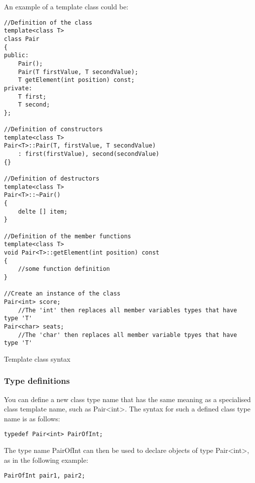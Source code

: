 An example of a template class could be:
\begin{listing}[H]
\begin{verbatim}
//Definition of the class
template<class T>
class Pair
{
public:
	Pair();
	Pair(T firstValue, T secondValue);
	T getElement(int position) const;
private:
	T first;
	T second;
};

//Definition of constructors
template<class T>
Pair<T>::Pair(T, firstValue, T secondValue)
	: first(firstValue), second(secondValue)
{}

//Definition of destructors
template<class T>
Pair<T>::~Pair()
{
	delte [] item;
}

//Definition of the member functions
template<class T>
void Pair<T>::getElement(int position) const
{
	//some function definition
}

//Create an instance of the class
Pair<int> score;
	//The 'int' then replaces all member variables types that have type 'T'
Pair<char> seats;
	//The 'char' then replaces all member variable tpyes that have type 'T'
\end{verbatim}
\caption{Template class syntax}
\label{source_code_1}
\end{listing}


\subsubsection*{Type definitions}
You can define a new class type name that has the same meaning as a specialised class template
name, such as Pair<int>. The syntax for such a defined class type name is as follows:

\begin{verbatim}
typedef Pair<int> PairOfInt;
\end{verbatim}

The type name PairOfInt can then be used to declare objects of type
Pair<int>, as in the following example:

\begin{verbatim}
PairOfInt pair1, pair2;
\end{verbatim}